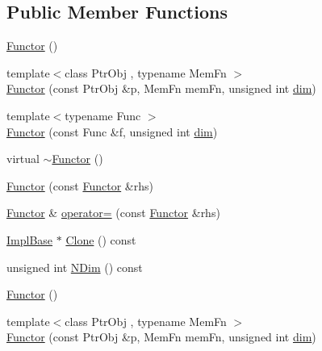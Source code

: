 \subsection*{Public Member Functions}
\begin{DoxyCompactItemize}
\item 
\mbox{\hyperlink{classROOT_1_1Math_1_1Functor_a2330648eca94b53b3ba613e49d03927f}{Functor}} ()
\item 
{\footnotesize template$<$class Ptr\+Obj , typename Mem\+Fn $>$ }\\\mbox{\hyperlink{classROOT_1_1Math_1_1Functor_ad6dbce8351bd8c74e6754215a3ccac41}{Functor}} (const Ptr\+Obj \&p, Mem\+Fn mem\+Fn, unsigned int \mbox{\hyperlink{irrep__util_8cc_a70b5e28b5bc3d1b63a7435c5fe50b837}{dim}})
\item 
{\footnotesize template$<$typename Func $>$ }\\\mbox{\hyperlink{classROOT_1_1Math_1_1Functor_a82af0df828055f18310af5d49dcc3aa2}{Functor}} (const Func \&f, unsigned int \mbox{\hyperlink{irrep__util_8cc_a70b5e28b5bc3d1b63a7435c5fe50b837}{dim}})
\item 
virtual \mbox{\hyperlink{classROOT_1_1Math_1_1Functor_a349935f827a453deb17fdad728849028}{$\sim$\+Functor}} ()
\item 
\mbox{\hyperlink{classROOT_1_1Math_1_1Functor_a001bfe27e95032f05685167e77e0efbd}{Functor}} (const \mbox{\hyperlink{classROOT_1_1Math_1_1Functor}{Functor}} \&rhs)
\item 
\mbox{\hyperlink{classROOT_1_1Math_1_1Functor}{Functor}} \& \mbox{\hyperlink{classROOT_1_1Math_1_1Functor_a24bd9cdf7e31e443bff64c5fb4378c99}{operator=}} (const \mbox{\hyperlink{classROOT_1_1Math_1_1Functor}{Functor}} \&rhs)
\item 
\mbox{\hyperlink{classROOT_1_1Math_1_1Functor_acc5dacb213f26296122e95138f5153b3}{Impl\+Base}} $\ast$ \mbox{\hyperlink{classROOT_1_1Math_1_1Functor_a989f9b6dd160ebe03911cdee00dacaad}{Clone}} () const
\item 
unsigned int \mbox{\hyperlink{classROOT_1_1Math_1_1Functor_a2544e2ed3c6a0420084c7b08eb3c3130}{N\+Dim}} () const
\item 
\mbox{\hyperlink{classROOT_1_1Math_1_1Functor_a2330648eca94b53b3ba613e49d03927f}{Functor}} ()
\item 
{\footnotesize template$<$class Ptr\+Obj , typename Mem\+Fn $>$ }\\\mbox{\hyperlink{classROOT_1_1Math_1_1Functor_ad6dbce8351bd8c74e6754215a3ccac41}{Functor}} (const Ptr\+Obj \&p, Mem\+Fn mem\+Fn, unsigned int \mbox{\hyperlink{irrep__util_8cc_a70b5e28b5bc3d1b63a7435c5fe50b837}{dim}})

\end{DoxyCompactItemize}
